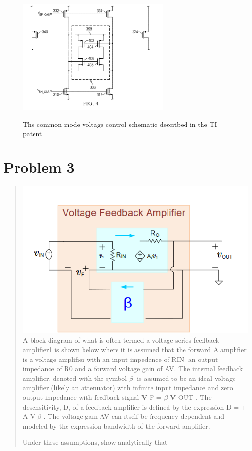 \documentclass[10pt,a4paper]{article}
\begin{document}
\begin{figure}[H]
\label{CM}
\centering

\includegraphics[width=3in]{images/TICMSchematic.png} \\
\caption{The common mode voltage control schematic described in the TI patent\cite{patent}}
\end{figure}



\section{Problem 3}
\begin{quote}
\includegraphics[width=6in]{images/problem3.png}\\

A block diagram of what is often termed a voltage-series feedback amplifier1 is shown below where it is assumed that the forward A amplifier is a voltage amplifier with an input impedance of RIN, an output impedance of R0 and a forward voltage gain of AV. The internal feedback amplifier, denoted with the symbol $\beta$, is assumed to be an ideal voltage amplifier (likely an attenuator) with infinite input impedance and zero output impedance with feedback signal \textbf{V} F = $\beta$ \textbf{V} OUT . The desensitivity, D, of a feedback amplifier is defined by the expression D = + A V $\beta$ . The voltage gain AV can itself be frequency dependent and modeled by the expression bandwidth of the forward amplifier.

Under these assumptions, show analytically that\\
\end{quote}
\end{document}
